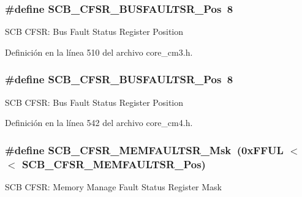 \subsubsection[{\texorpdfstring{S\+C\+B\+\_\+\+C\+F\+S\+R\+\_\+\+B\+U\+S\+F\+A\+U\+L\+T\+S\+R\+\_\+\+Pos}{SCB_CFSR_BUSFAULTSR_Pos}}]{\setlength{\rightskip}{0pt plus 5cm}\#define S\+C\+B\+\_\+\+C\+F\+S\+R\+\_\+\+B\+U\+S\+F\+A\+U\+L\+T\+S\+R\+\_\+\+Pos~8}\hypertarget{group___c_m_s_i_s___s_c_b_ga555a24f4f57d199f91d1d1ab7c8c3c8a}{}\label{group___c_m_s_i_s___s_c_b_ga555a24f4f57d199f91d1d1ab7c8c3c8a}
S\+CB C\+F\+SR\+: Bus Fault Status Register Position 

Definición en la línea 510 del archivo core\+\_\+cm3.\+h.

\subsubsection[{\texorpdfstring{S\+C\+B\+\_\+\+C\+F\+S\+R\+\_\+\+B\+U\+S\+F\+A\+U\+L\+T\+S\+R\+\_\+\+Pos}{SCB_CFSR_BUSFAULTSR_Pos}}]{\setlength{\rightskip}{0pt plus 5cm}\#define S\+C\+B\+\_\+\+C\+F\+S\+R\+\_\+\+B\+U\+S\+F\+A\+U\+L\+T\+S\+R\+\_\+\+Pos~8}\hypertarget{group___c_m_s_i_s___s_c_b_ga555a24f4f57d199f91d1d1ab7c8c3c8a}{}\label{group___c_m_s_i_s___s_c_b_ga555a24f4f57d199f91d1d1ab7c8c3c8a}
S\+CB C\+F\+SR\+: Bus Fault Status Register Position 

Definición en la línea 542 del archivo core\+\_\+cm4.\+h.

\subsubsection[{\texorpdfstring{S\+C\+B\+\_\+\+C\+F\+S\+R\+\_\+\+M\+E\+M\+F\+A\+U\+L\+T\+S\+R\+\_\+\+Msk}{SCB_CFSR_MEMFAULTSR_Msk}}]{\setlength{\rightskip}{0pt plus 5cm}\#define S\+C\+B\+\_\+\+C\+F\+S\+R\+\_\+\+M\+E\+M\+F\+A\+U\+L\+T\+S\+R\+\_\+\+Msk~(0x\+F\+F\+U\+L $<$$<$ S\+C\+B\+\_\+\+C\+F\+S\+R\+\_\+\+M\+E\+M\+F\+A\+U\+L\+T\+S\+R\+\_\+\+Pos)}\hypertarget{group___c_m_s_i_s___s_c_b_gad46716159a3808c9e7da22067d6bec98}{}\label{group___c_m_s_i_s___s_c_b_gad46716159a3808c9e7da22067d6bec98}
S\+CB C\+F\+SR\+: Memory Manage Fault Status Register Mask 

